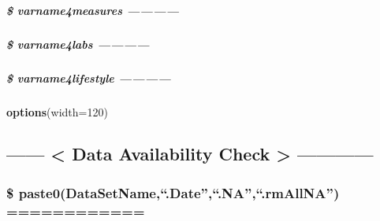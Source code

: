 \documentclass[
]{article}
\newenvironment{Shaded}{\begin{snugshade}}{\end{snugshade}}
\newcommand{\AttributeTok}[1]{\textcolor[rgb]{0.13,0.29,0.53}{#1}}
\newcommand{\DecValTok}[1]{\textcolor[rgb]{0.00,0.00,0.81}{#1}}
\newcommand{\FunctionTok}[1]{\textcolor[rgb]{0.13,0.29,0.53}{\textbf{#1}}}
\newcommand{\NormalTok}[1]{#1}
\begin{document}
\hypertarget{varname4measures}{%
\subparagraph{\$ varname4measures ------------}\label{varname4measures}}

\hypertarget{varname4labs}{%
\subparagraph{\$ varname4labs ------------}\label{varname4labs}}

\hypertarget{varname4lifestyle}{%
\subparagraph{\$ varname4lifestyle
------------}\label{varname4lifestyle}}

\begin{Shaded}
\begin{Highlighting}[]
\FunctionTok{options}\NormalTok{(}\AttributeTok{width=}\DecValTok{120}\NormalTok{)}
\end{Highlighting}
\end{Shaded}

\hypertarget{data-availability-check}{%
\subsection{------ \textless{} Data Availability Check \textgreater{}
------------}\label{data-availability-check}}

\hypertarget{paste0datasetname.date.na.rmallna}{%
\subsubsection{\$ paste0(DataSetName,``.Date'',``.NA'',``.rmAllNA'')
============}\label{paste0datasetname.date.na.rmallna}}
\end{document}
